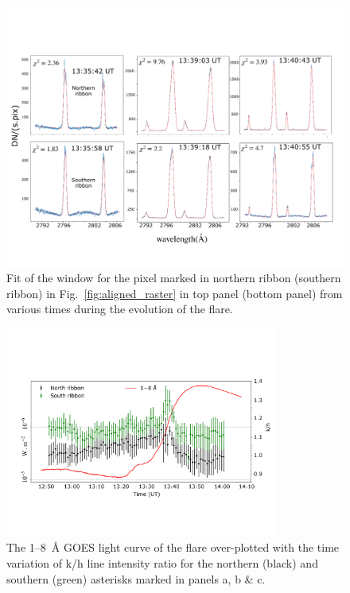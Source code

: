 \begin{figure}[ht!]
    \centering
    \includegraphics[trim={0cm 3cm 0.5cm 3cm},clip,width=\textwidth]{Figures/pix_fit.pdf}
    \caption[Fit of the ~window for a pixel.]{Fit of the  window for the pixel marked in northern ribbon (southern ribbon) in Fig.~\ref{fig:aligned_raster} in top panel (bottom panel) from various times during the evolution of the flare. }
    \label{fig:pix_fit_ribbon}
\end{figure}

\begin{figure}[ht!]
\centering  
\includegraphics[trim={1.5cm 4cm 0.5cm 4cm},clip,width=0.8\textwidth]{Figures/m_flare_iris_pt2.pdf}
\caption[The 1{--}8~{\AA} GOES light curve of the flare over-plotted with the time variation of ~k/h line intensity ratio.]{The 1{--}8~{\AA} GOES light curve of the flare over-plotted with the time variation of   k/h line intensity ratio for the northern (black) and southern (green) asterisks marked in panels a, b \& c.}
\label{fig:aligned_iris_ratio}
\end{figure}

